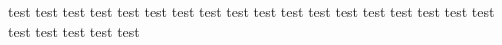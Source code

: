 ﻿\documentclass{ctexart}
\begin{document}
    test\vspace{2em} test test test test test test test test test test test test test test test test test test test test test test 
\end{document}

